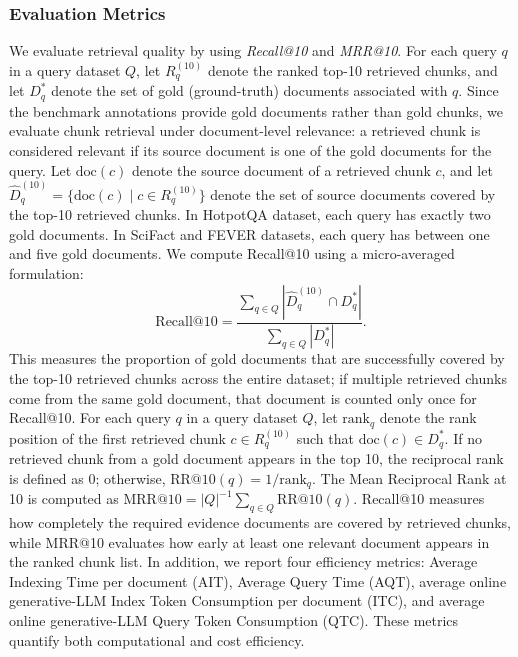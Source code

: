 \documentclass[conference]{IEEEtran}
\begin{document}
\subsubsection{Evaluation Metrics}
We evaluate retrieval quality by using \emph{Recall@10} and \emph{MRR@10}. For each query $q$ in a query dataset $Q$, let $R_q^{(10)}$ denote the ranked top-10 retrieved chunks, and let $D_q^\ast$ denote the set of gold (ground-truth) documents associated with $q$. Since the benchmark annotations provide gold documents rather than gold chunks, we evaluate chunk retrieval under document-level relevance: a retrieved chunk is considered relevant if its source document is one of the gold documents for the query. Let $\mathrm{doc}(c)$ denote the source document of a retrieved chunk $c$, and let $\hat{D}_q^{(10)}=\{\mathrm{doc}(c)\mid c\in R_q^{(10)}\}$ denote the set of source documents covered by the top-10 retrieved chunks. In HotpotQA dataset, each query has exactly two gold documents. In SciFact and FEVER datasets, each query has between one and five gold documents. We compute Recall@10 using a micro-averaged formulation:
\[
\text{Recall@10} =
\frac{
\sum_{q \in Q} | \hat{D}_q^{(10)} \cap D_q^\ast |
}{
\sum_{q \in Q} | D_q^\ast |
}.
\]
This measures the proportion of gold documents that are successfully covered by the top-10 retrieved chunks across the entire dataset; if multiple retrieved chunks come from the same gold document, that document is counted only once for Recall@10. For each query $q$ in a query dataset $Q$, let $\text{rank}_q$ denote the rank position of the first retrieved chunk $c \in R_q^{(10)}$ such that $\mathrm{doc}(c)\in D_q^\ast$. If no retrieved chunk from a gold document appears in the top 10, the reciprocal rank is defined as 0; otherwise, $\text{RR@10}(q)=1/\text{rank}_q$. The Mean Reciprocal Rank at 10 is computed as $\text{MRR@10}=|Q|^{-1}\sum_{q \in Q}\text{RR@10}(q)$. Recall@10 measures how completely the required evidence documents are covered by retrieved chunks, while MRR@10 evaluates how early at least one relevant document appears in the ranked chunk list. In addition, we report four efficiency metrics: Average Indexing Time per document (AIT), Average Query Time (AQT), average online generative-LLM Index Token Consumption per document (ITC), and average online generative-LLM Query Token Consumption (QTC). These metrics quantify both computational and cost efficiency.
\end{document}
